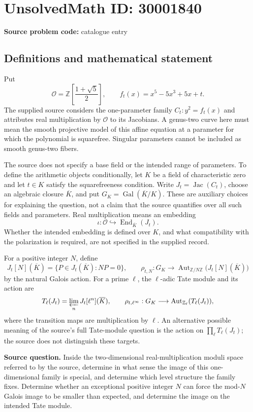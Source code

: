 \documentclass[11pt]{article}
\begin{document}
\section*{UnsolvedMath ID: 30001840}
\textbf{Source problem code:} catalogue entry
\subsection{Definitions and mathematical statement}
Put
\[
\mathcal O=\mathbb Z\!\left[\frac{1+\sqrt5}{2}\right],\qquad f_t(x)=x^5-5x^3+5x+t.
\]
The supplied source considers the one-parameter family \(C_t:y^2=f_t(x)\) and attributes real multiplication by \(\mathcal O\) to its Jacobians. A genus-two curve here must mean the smooth projective model of this affine equation at a parameter for which the polynomial is squarefree. Singular parameters cannot be included as smooth genus-two fibers.

The source does not specify a base field or the intended range of parameters. To define the arithmetic objects conditionally, let \(K\) be a field of characteristic zero and let \(t\in K\) satisfy the squarefreeness condition. Write \(J_t=\operatorname{Jac}(C_t)\), choose an algebraic closure \(\overline K\), and put \(G_K=\operatorname{Gal}(\overline K/K)\). These are auxiliary choices for explaining the question, not a claim that the source quantifies over all such fields and parameters. Real multiplication means an embedding
\[
\iota:\mathcal O\hookrightarrow\operatorname{End}_{\overline K}(J_t).
\]
Whether the intended embedding is defined over \(K\), and what compatibility with the polarization is required, are not specified in the supplied record.

For a positive integer \(N\), define
\[
J_t[N](\overline K)=\{P\in J_t(\overline K):NP=0\},\qquad
\rho_{t,N}:G_K\longrightarrow\operatorname{Aut}_{\mathbb Z/N\mathbb Z}\bigl(J_t[N](\overline K)\bigr)
\]
by the natural Galois action. For a prime \(\ell\), the \(\ell\)-adic Tate module and its action are
\[
T_\ell(J_t)=\varprojlim_n J_t[\ell^n](\overline K),\qquad
\rho_{t,\ell^\infty}:G_K\longrightarrow\operatorname{Aut}_{\mathbb Z_\ell}(T_\ell(J_t)),
\]
where the transition maps are multiplication by \(\ell\). An alternative possible meaning of the source's full Tate-module question is the action on \(\prod_{\ell}T_\ell(J_t)\); the source does not distinguish these targets.

\textbf{Source question.} Inside the two-dimensional real-multiplication moduli space referred to by the source, determine in what sense the image of this one-dimensional family is special, and determine which level structure the family fixes. Determine whether an exceptional positive integer \(N\) can force the mod-\(N\) Galois image to be smaller than expected, and determine the image on the intended Tate module.
\end{document}
